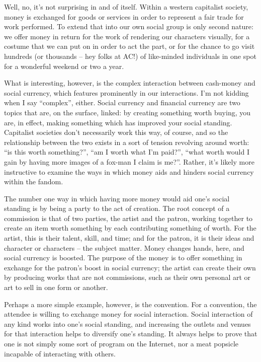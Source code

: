 Well, no, it's not surprising in and of itself.  Within a western capitalist society, money is exchanged for goods or services in order to represent a fair trade for work performed.  To extend that into our own social group is only second nature: we offer money in return for the work of rendering our characters visually, for a costume that we can put on in order to act the part, or for the chance to go visit hundreds (or thousands -- hey folks at AC!) of like-minded individuals in one spot for a wonderful weekend or two a year.

What is interesting, however, is the complex interaction between cash-money and social currency, which features prominently in our interactions.  I'm not kidding when I say ``complex'', either.  Social currency and financial currency are two topics that are, on the surface, linked: by creating something worth buying, you are, in effect, making something which has improved your social standing.  Capitalist societies don't necessarily work this way, of course, and so the relationship between the two exists in a sort of tension revolving around worth: ``is this worth something?'', ``am I worth what I'm paid?'', ``what worth would I gain by having more images of a fox-man I claim is me?''.  Rather, it's likely more instructive to examine the ways in which money aids and hinders social currency within the fandom.

The number one way in which having more money would aid one's social standing is by being a party to the act of creation.  The root concept of a commission is that of two parties, the artist and the patron, working together to create an item worth something by each contributing something of worth.  For the artist, this is their talent, skill, and time; and for the patron, it is their ideas and character or characters -- the subject matter.  Money changes hands, here, and social currency is boosted.  The purpose of the money is to offer something in exchange for the patron's boost in social currency; the artist can create their own by producing works that are not commissions, such as their own personal art or art to sell in one form or another.

Perhaps a more simple example, however, is the convention.  For a convention, the attendee is willing to exchange money for social interaction.  Social interaction of any kind works into one's social standing, and increasing the outlets and venues for that interaction helps to diversify one's standing.  It always helps to prove that one is not simply some sort of program on the Internet, nor a meat popsicle incapable of interacting with others.

